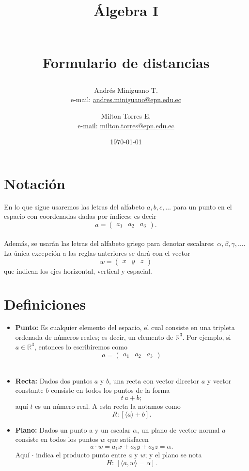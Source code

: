 \documentclass[11pt, a4paper]{article} %
\title{\begin{large}Álgebra  I\end{large}\\ Formulario de distancias}
\author{Andrés Miniguano T. \\ e-mail: \href{mailto:andres.miniguano@epn.edu.ec}{andres.miniguano@epn.edu.ec}
   \and Milton Torres E. \\ e-mail: \href{mailto:milton.torres@epn.edu.ec}{milton.torres@epn.edu.ec} }
\date{\today}
\begin{document}

\maketitle
\section{Notación}
En lo que sigue usaremos las letras del alfabeto
\(a,b,c,\ldots\) para un punto en el espacio con coordenadas dadas por índices; es decir
\[ a=  \begin{pmatrix}  a_1 & a_2 & a_3 \end{pmatrix}.\]\\
Además, se usarán las letras del alfabeto griego para denotar escalares: \(\alpha, \beta, \gamma, \ldots\). \\ \noindent
La única excepción a las reglas anteriores se dará con el vector\[ 	w=  \begin{pmatrix}  x & y & z\end{pmatrix}\]que indican los ejes horizontal, vertical y espacial.

\section{Definiciones}
\begin{itemize}
\item\textbf{Punto:} 
Es cualquier elemento del espacio, el cual consiste en una tripleta ordenada de números reales; es decir, un elemento de 
\( \mathbb{R}^{3} \). Por ejemplo, si \( a\in \mathbb{R}^{3}\), entonces lo escribiremos como
\[a =\left( \begin{matrix}a_1 & a_2 & a_3\end{matrix}\right)\] \\

\item\textbf{Recta:} 
Dados dos puntos \(a\) y \(b\), una recta con vector director \(a\) y vector constante \(b\) consiste en todos los puntos de la forma\begin{equation*}t \,a + b;\end{equation*}aquí \(t\) es un número real. A esta recta la notamos como\[R: [\langle a\rangle + b].\]

\item\textbf{Plano:} 
Dados un punto a y un escalar \(\alpha\), un plano de vector normal \(a\) consiste en todos los puntos \(w\) que satisfacen$$a \cdot  w = a_1 x + a_2 y + a_3 z = \alpha.$$Aquí \( \cdot\) indica el producto punto entre \(a\) y \(w\); y el plano se nota\[H: \, [ \langle a,w \rangle = \alpha ].\]
\end{itemize}
\end{document}
